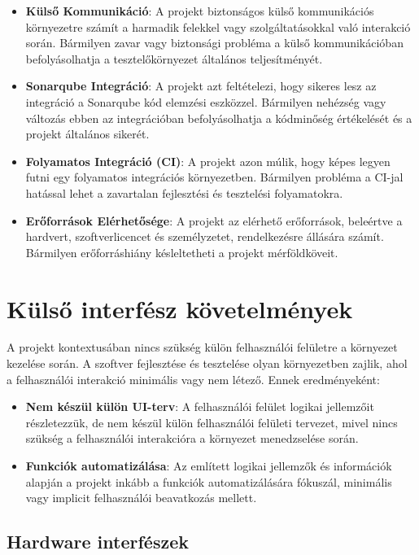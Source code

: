 \documentclass{scrreprt}
\begin{document}
\begin{itemize}
      \item \textbf{Külső Kommunikáció}:
            A projekt biztonságos külső kommunikációs környezetre számít a harmadik felekkel vagy szolgáltatásokkal való interakció során. Bármilyen zavar vagy biztonsági probléma a külső kommunikációban befolyásolhatja a tesztelőkörnyezet általános teljesítményét.
      \item \textbf{Sonarqube Integráció}:
            A projekt azt feltételezi, hogy sikeres lesz az integráció a Sonarqube kód elemzési eszközzel. Bármilyen nehézség vagy változás ebben az integrációban befolyásolhatja a kódminőség értékelését és a projekt általános sikerét.
      \item \textbf{Folyamatos Integráció (CI)}:
            A projekt azon múlik, hogy képes legyen futni egy folyamatos integrációs környezetben. Bármilyen probléma a CI-jal hatással lehet a zavartalan fejlesztési és tesztelési folyamatokra.
      \item \textbf{Erőforrások Elérhetősége}:
            A projekt az elérhető erőforrások, beleértve a hardvert, szoftverlicencet és személyzetet, rendelkezésre állására számít. Bármilyen erőforráshiány késleltetheti a projekt mérföldköveit.
\end{itemize}

\chapter{Külső interfész követelmények}

A projekt kontextusában nincs szükség külön felhasználói felületre a környezet kezelése során. A szoftver fejlesztése és tesztelése olyan környezetben zajlik,
ahol a felhasználói interakció minimális vagy nem létező. Ennek eredményeként:
\begin{itemize}
      \item \textbf{Nem készül külön UI-terv}:
            A felhasználói felület logikai jellemzőit részletezzük, de nem készül külön felhasználói felületi tervezet, mivel nincs szükség a felhasználói interakcióra a környezet menedzselése során.
      \item \textbf{Funkciók automatizálása}:
            Az említett logikai jellemzők és információk alapján a projekt inkább a funkciók automatizálására fókuszál, minimális vagy implicit felhasználói beavatkozás mellett.
\end{itemize}

\section{Hardware interfészek}
\end{document}

